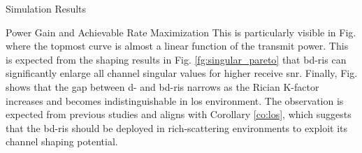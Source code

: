 \documentclass[journal]{IEEEtran}
\begin{document}
\begin{section}{Simulation Results}
\begin{subsection}{Power Gain and Achievable Rate Maximization}
		This is particularly visible in Fig.  where the topmost curve is almost a linear function of the transmit power.
		This is expected from the shaping results in Fig. \ref{fg:singular_pareto} that \gls{bd}-\gls{ris} can significantly enlarge all channel singular values for higher receive \gls{snr}.
		Finally, Fig.  shows that the gap between \gls{d}- and \gls{bd}-\gls{ris} narrows as the Rician K-factor increases and becomes indistinguishable in \gls{los} environment.
		The observation is expected from previous studies \cite{Shen2020a,Li2023b,Nerini2023} and aligns with Corollary \ref{co:los}, which suggests that the \gls{bd}-\gls{ris} should be deployed in rich-scattering environments to exploit its channel shaping potential.
	\end{subsection}
\end{section}
\end{document}
